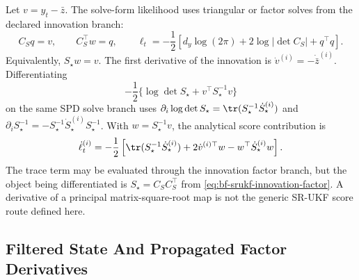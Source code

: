 Let \(v=y_t-\bar z\).  The solve-form likelihood uses triangular or factor
solves from the declared innovation branch:
\begin{equation}
\label{eq:bf-srukf-loglik-solve}
  C_S q=v,\qquad C_S^\top w=q,\qquad
  \ell_t
  =
  -\frac12
  \left[
    d_y\log(2\pi)+2\log|\det C_S|+q^\top q
  \right].
\end{equation}
Equivalently, \(S_\star w=v\).  The first derivative of the innovation is
\(\dot v^{(i)}=-\dot{\bar z}^{(i)}\).  Differentiating
\[
  -\frac12\{\log\det S_\star+v^\top S_\star^{-1}v\}
\]
on the same SPD solve branch uses
\(\partial_i\log\det S_\star=\tr(S_\star^{-1}\dot S_\star^{(i)})\) and
\(\partial_i S_\star^{-1}
=-S_\star^{-1}\dot S_\star^{(i)}S_\star^{-1}\).  With
\(w=S_\star^{-1}v\), the analytical score contribution is
\begin{equation}
\label{eq:bf-srukf-score-first}
  \dot\ell_t^{(i)}
  =
  -\frac12
  \left[
    \tr(S_\star^{-1}\dot S_\star^{(i)})
    +2\dot v^{(i)\top}w
    -w^\top\dot S_\star^{(i)}w
  \right].
\end{equation}
The trace term may be evaluated through the innovation factor branch, but the
object being differentiated is \(S_\star=C_SC_S^\top\) from
\eqref{eq:bf-srukf-innovation-factor}.  A derivative of a principal
matrix-square-root map is not the generic SR-UKF score route defined here.

\subsection{Filtered State And Propagated Factor Derivatives}
\label{sec:bf-srukf-filtered-state}

